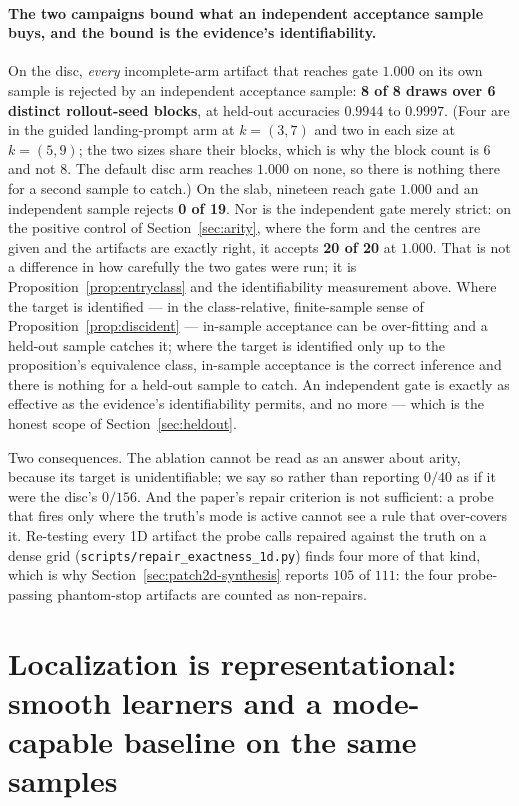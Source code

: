 \documentclass[11pt]{article}
\theoremstyle{definition}
\theoremstyle{remark}
\begin{document}
\paragraph{The two campaigns bound what an independent acceptance sample buys, and the bound is the evidence's identifiability.} On the disc, \emph{every} incomplete-arm artifact that reaches gate $1.000$ on its own sample is rejected by an independent acceptance sample: \textbf{8 of 8 draws over 6 distinct rollout-seed blocks}, at held-out accuracies $0.9944$ to $0.9997$. (Four are in the guided landing-prompt arm at $k = (3,7)$ and two in each size at $k = (5,9)$; the two sizes share their blocks, which is why the block count is $6$ and not $8$. The default disc arm reaches $1.000$ on none, so there is nothing there for a second sample to catch.) On the slab, nineteen reach gate $1.000$ and an independent sample rejects \textbf{0 of 19}. Nor is the independent gate merely strict: on the positive control of Section~\ref{sec:arity}, where the form and the centres are given and the artifacts are exactly right, it accepts \textbf{20 of 20} at $1.000$. That is not a difference in how carefully the two gates were run; it is Proposition~\ref{prop:entryclass} and the identifiability measurement above. Where the target is identified --- in the class-relative, finite-sample sense of Proposition~\ref{prop:discident} --- in-sample acceptance can be over-fitting and a held-out sample catches it; where the target is identified only up to the proposition's equivalence class, in-sample acceptance is the correct inference and there is nothing for a held-out sample to catch. An independent gate is exactly as effective as the evidence's identifiability permits, and no more --- which is the honest scope of Section~\ref{sec:heldout}.

Two consequences. The ablation cannot be read as an answer about arity, because its target is unidentifiable; we say so rather than reporting $0/40$ as if it were the disc's $0/156$. And the paper's repair criterion is not sufficient: a probe that fires only where the truth's mode is active cannot see a rule that over-covers it. Re-testing every 1D artifact the probe calls repaired against the truth on a dense grid (\texttt{scripts/\allowbreak repair\_\allowbreak exactness\_\allowbreak 1d.py}) finds four more of that kind, which is why Section~\ref{sec:patch2d-synthesis} reports $105$ of $111$: the four probe-passing phantom-stop artifacts are counted as non-repairs.

\section{Localization is representational: smooth learners and a mode-capable baseline on the same samples}
\label{sec:smooth}
\end{document}
